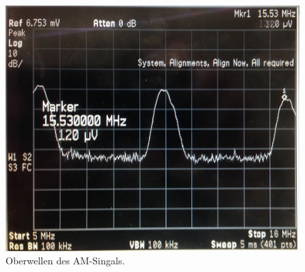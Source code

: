 \begin{figure}
    \centering
    \includegraphics[width=0.8\linewidth]{images/am-diode-oberwellen.jpg}
    \caption{
        Oberwellen des AM-Singals.
    }
    \label{fig:am-diode-oberwellen}
\end{figure}

